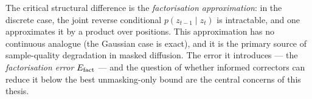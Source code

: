 \noindent The critical structural difference is the \emph{factorisation approximation}:
in the discrete case, the joint reverse conditional $p(z_{t-1} \mid z_t)$ is intractable,
and one approximates it by a product over positions. This approximation has no continuous
analogue (the Gaussian case is exact), and it is the primary source of sample-quality
degradation in masked diffusion. The error it introduces --- the \emph{factorisation
error} $E_{\mathrm{fact}}$ --- and the question of whether informed correctors can reduce it below
the best unmasking-only bound are the central concerns of this thesis.

